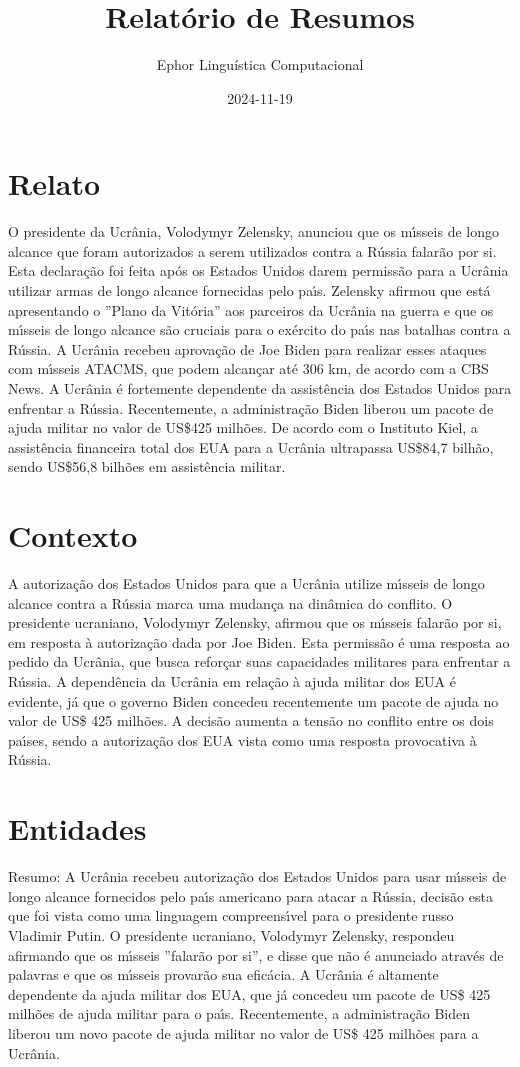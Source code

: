 \documentclass{article}%
\title{Relatório de Resumos}%
\author{Ephor Linguística Computacional}%
\date{2024{-}11{-}19}%
\begin{document}
%
\normalsize%
\section{Relato}%
\label{sec:Relato}%
O presidente da Ucr\^ania, Volodymyr Zelensky, anunciou que os m{\'\i}sseis de longo alcance que foram autorizados a serem utilizados contra a R\'ussia falar\~ao por si. Esta declara\c{c}\~ao foi feita ap\'os os Estados Unidos darem permiss\~ao para a Ucr\^ania utilizar armas de longo alcance fornecidas pelo pa{\'\i}s. Zelensky afirmou que est\'a apresentando o ''Plano da Vit\'oria'' aos parceiros da Ucr\^ania na guerra e que os m{\'\i}sseis de longo alcance s\~ao cruciais para o ex\'ercito do pa{\'\i}s nas batalhas contra a R\'ussia. A Ucr\^ania recebeu aprova\c{c}\~ao de Joe Biden para realizar esses ataques com m{\'\i}sseis ATACMS, que podem alcan\c{c}ar at\'e 306 km, de acordo com a CBS News. A Ucr\^ania \'e fortemente dependente da assist\^encia dos Estados Unidos para enfrentar a R\'ussia. Recentemente, a administra\c{c}\~ao Biden liberou um pacote de ajuda militar no valor de US\$425 milh\~oes. De acordo com o Instituto Kiel, a assist\^encia financeira total dos EUA para a Ucr\^ania ultrapassa US\$84,7 bilh\~ao, sendo US\$56,8 bilh\~oes em assist\^encia militar.

%
\section{Contexto}%
\label{sec:Contexto}%
A autoriza\c{c}\~ao dos Estados Unidos para que a Ucr\^ania utilize m{\'\i}sseis de longo alcance contra a R\'ussia marca uma mudan\c{c}a na din\^amica do conflito. O presidente ucraniano, Volodymyr Zelensky, afirmou que os m{\'\i}sseis falar\~ao por si, em resposta \`a autoriza\c{c}\~ao dada por Joe Biden. Esta permiss\~ao \'e uma resposta ao pedido da Ucr\^ania, que busca refor\c{c}ar suas capacidades militares para enfrentar a R\'ussia. A depend\^encia da Ucr\^ania em rela\c{c}\~ao \`a ajuda militar dos EUA \'e evidente, j\'a que o governo Biden concedeu recentemente um pacote de ajuda no valor de US\$ 425 milh\~oes. A decis\~ao aumenta a tens\~ao no conflito entre os dois pa{\'\i}ses, sendo a autoriza\c{c}\~ao dos EUA vista como uma resposta provocativa \`a R\'ussia.

%
\section{Entidades}%
\label{sec:Entidades}%
Resumo:
A Ucr\^ania recebeu autoriza\c{c}\~ao dos Estados Unidos para usar m{\'\i}sseis de longo alcance fornecidos pelo pa{\'\i}s americano para atacar a R\'ussia, decis\~ao esta que foi vista como uma linguagem compreens{\'\i}vel para o presidente russo Vladimir Putin. O presidente ucraniano, Volodymyr Zelensky, respondeu afirmando que os m{\'\i}sseis ''falar\~ao por si'', e disse que n\~ao \'e anunciado atrav\'es de palavras e que os m{\'\i}sseis provar\~ao sua efic\'acia. A Ucr\^ania \'e altamente dependente da ajuda militar dos EUA, que j\'a concedeu um pacote de US\$ 425 milh\~oes de ajuda militar para o pa{\'\i}s. Recentemente, a administra\c{c}\~ao Biden liberou um novo pacote de ajuda militar no valor de US\$ 425 milh\~oes para a Ucr\^ania.
\end{document}
